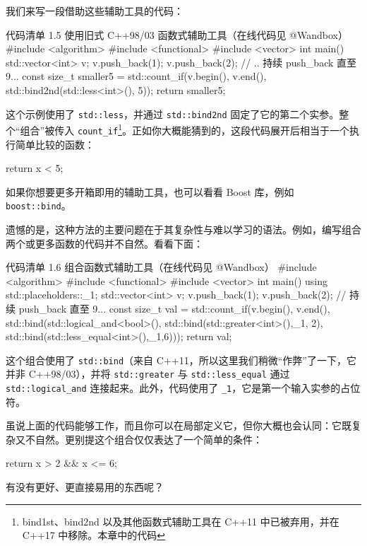我们来写一段借助这些辅助工具的代码：

\begin{codeboxt}{代码清单 1.5 使用旧式 C++98/03 函数式辅助工具（在线代码见 @Wandbox）}
#include <algorithm>
#include <functional>
#include <vector>
int main() {
std::vector<int> v;
v.push_back(1);
v.push_back(2);
// .. 持续 push_back 直至 9...
const size_t smaller5 = std::count_if(v.begin(), v.end(),
std::bind2nd(std::less<int>(), 5));
return smaller5;
}
\end{codeboxt}

这个示例使用了 \texttt{std::less}，并通过 \texttt{std::bind2nd} 固定了它的第二个实参。整个“组合”被传入 \texttt{count\_if}\footnote{bind1st、bind2nd 以及其他函数式辅助工具在 C++11 中已被弃用，并在 C++17 中移除。本章中的代码}。正如你大概能猜到的，这段代码展开后相当于一个执行简单比较的函数：

\begin{codebox}
return x < 5;
\end{codebox}

如果你想要更多开箱即用的辅助工具，也可以看看 Boost 库，例如 \texttt{boost::bind}。

遗憾的是，这种方法的主要问题在于其复杂性与难以学习的语法。例如，编写组合两个或更多函数的代码并不自然。看看下面：

\begin{codeboxt}{代码清单 1.6 组合函数式辅助工具（在线代码见 @Wandbox）}
#include <algorithm>
#include <functional>
#include <vector>
int main() {
using std::placeholders::_1;
std::vector<int> v;
v.push_back(1);
v.push_back(2);
// 持续 push_back 直至 9...
const size_t val = std::count_if(v.begin(), v.end(),
std::bind(std::logical_and<bool>(),
std::bind(std::greater<int>(),_1, 2),
std::bind(std::less_equal<int>(),_1,6)));
return val;
}
\end{codeboxt}

这个组合使用了 \texttt{std::bind}（来自 C++11，所以这里我们稍微“作弊”了一下，它并非 C++98/03），并将 \texttt{std::greater} 与 \texttt{std::less\_equal} 通过 \texttt{std::logical\_and} 连接起来。此外，代码使用了 \texttt{\_1}，它是第一个输入实参的占位符。

虽说上面的代码能够工作，而且你可以在局部定义它，但你大概也会认同：它既复杂又不自然。更别提这个组合仅仅表达了一个简单的条件：

\begin{codebox}
return x > 2 && x <= 6;
\end{codebox}

有没有更好、更直接易用的东西呢？

